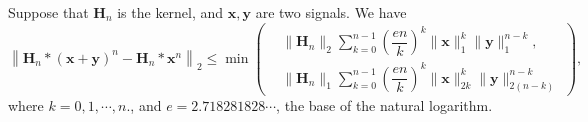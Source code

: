 \documentclass[twoside,11pt]{article}
\def\tvar#1{\mathbf{#1}} %
\begin{document}
\begin{lemma}
  Suppose that \(\tvar{H}_n\) is the kernel, and \(\tvar{x}, \tvar{y}\) are two signals. We have
  \begin{equation}
    \left\| \tvar{H}_n * (\tvar{x} + \tvar{y})^n - \tvar{H}_n  * \tvar{x}^n \right\|_2
    \le \min\left(\begin{aligned}
         & \| \tvar{H}_n \|_2 \sum_{k=0}^{n-1} \left(\dfrac{e n}{k}\right)^k \|\tvar{x}\|_1^k \| \tvar{y} \|_1^{n-k},          \\
         & \| \tvar{H}_n \|_1 \sum_{k=0}^{n-1} \left(\dfrac{e n}{k}\right)^k \|\tvar{x}\|_{2k}^k \| \tvar{y} \|_{2(n-k)}^{n-k}
      \end{aligned}\right),
  \end{equation}
  where \(k= 0, 1, \cdots, n.\), and \(e = 2.718281828\cdots\), the base of the natural logarithm.
  \label{lemma:inequality-order-n-convolution-perturbation}
\end{lemma}
\end{document}
